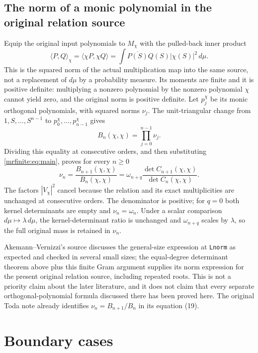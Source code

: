 \subsection{The norm of a monic polynomial in the original relation source}
\label{mrfinite:sec:relationnorm}

Equip the original input polynomials to \(M_\chi\) with the pulled-back
inner product
\[
 \langle P,Q\rangle_\chi=\langle\chi P,\chi Q\rangle
 =\int\overline{P(S)}Q(S)|\chi(S)|^2\,d\mu.
\]
This is the squared norm of the actual multiplication map into the same
source, not a replacement of \(d\mu\) by a probability measure. Its
moments are finite and it is positive definite: multiplying a nonzero
polynomial by the nonzero polynomial \(\chi\) cannot yield zero, and
the original norm is positive definite. Let \(p_j^\chi\) be its monic
orthogonal polynomials, with squared norms \(\nu_j\).
The unit-triangular change from \(1,S,\ldots,S^{n-1}\) to
\(p_0^\chi,\ldots,p_{n-1}^\chi\) gives
\[
 B_n(\chi,\chi)=\prod_{j=0}^{n-1}\nu_j.
\]
Dividing this equality at consecutive orders, and then substituting
\eqref{mrfinite:eq:main}, proves for every \(n\geq0\)
\begin{equation}\label{mrfinite:eq:relationnorm}
 \boxed{\nu_n=\frac{B_{n+1}(\chi,\chi)}{B_n(\chi,\chi)}
       =\omega_{n+q}
          \frac{\det C_{n+1}(\chi,\chi)}
               {\det C_n(\chi,\chi)}.}
\end{equation}
The factors \(|V_\chi|^2\) cancel because the relation and its exact
multiplicities are unchanged at consecutive orders. The denominator
is positive; for \(q=0\) both kernel determinants are empty and
\(\nu_n=\omega_n\). Under a scalar comparison
\(d\mu\mapsto\lambda\,d\mu\), the kernel-determinant ratio is
unchanged and \(\omega_{n+q}\) scales by \(\lambda\), so the full
original mass is retained in \(\nu_n\).

Akemann--Vernizzi's source discusses the general-size expression at
\texttt{Lnorm} as expected and checked in several small sizes; the
equal-degree determinant theorem above plus this finite Gram argument
supplies its norm expression for the present original relation source,
including repeated roots. This is not a priority claim about the later
literature, and it does not claim that every separate orthogonal-polynomial
formula discussed there has been proved here. The original Toda note
already identifies \(\nu_n=B_{n+1}/B_n\) in its equation (19).

\section{Boundary cases}\label{mrfinite:sec:boundary}

